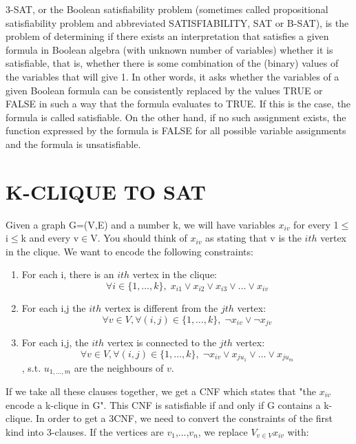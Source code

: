 \documentclass[table]{article}
\begin{document}
\leftskip=0.5in 
3-SAT, or the Boolean satisfiability problem (sometimes called propositional satisfiability problem and abbreviated SATISFIABILITY, SAT or B-SAT), is the problem of determining if there exists an interpretation that satisfies a given formula in Boolean algebra (with unknown number of variables) whether it is satisfiable, that is, whether there is some combination of the (binary) values of the variables that will give 1.
In other words, it asks whether the variables of a given Boolean formula can be consistently replaced by the values TRUE or FALSE in such a way that the formula evaluates to TRUE. If this is the case, the formula is called satisfiable. On the other hand, if no such assignment exists, the function expressed by the formula is FALSE for all possible variable assignments and the formula is unsatisfiable.\newline

\leftskip=0.0in 
\section{K-CLIQUE TO SAT}

\leftskip=0.5in 
Given a graph G=(V,E) and a number k, we will have variables $x_{iv}$ for every 1$\leq$i$\leq$k and every v$\in$V. You should think of $x_{iv}$ as stating that v is the $ith$ vertex in the clique. We want to encode the following constraints:

\begin{enumerate}\leftskip=0.8in 
\item 	For each i, there is an $ith$ vertex in the clique: \[\forall i\in \{1,\dots,k\}, \; x_{i1} \lor x_{i2} \lor x_{i3} \lor \dots \lor x_{iv}\]
\item   For each i,j the $ith$ vertex is different from the $jth$ vertex: \[\forall v\in V, \forall(i,j)\in \{1,\dots,k\}, \; \neg x_{iv} \lor \neg x_{jv}\]
\item 	For each i,j, the $ith$ vertex is connected to the $jth$ vertex: \[\forall v\in V, \forall(i,j)\in \{1,\dots,k\}, \; \neg x_{iv} \lor x_{ju_1} \lor \dots \lor x_{ju_m}\], s.t. $u_{1,\dots,m}$ are the neighbours of $v$.
\end{enumerate}

\leftskip=0.5in
If we take all these clauses together, we get a CNF which states that "the $x_{iv}$ encode a k-clique in G". This CNF is satisfiable if and only if G contains a k-clique.
In order to get a 3CNF, we need to convert the constraints of the first kind into 3-clauses. If the vertices are $v_1$,...,$v_n$, we replace $V_{v \in V} x_{iv}$ with:
\end{document}
